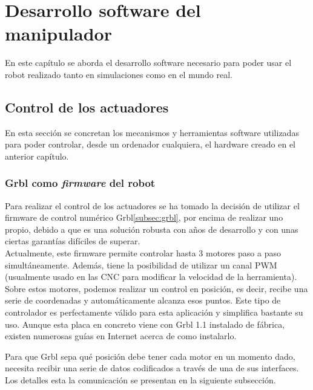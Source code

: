 \chapter{Desarrollo software del manipulador}
\label{cap:capitulo6}

\vspace{1cm}
\noindent En este capítulo se aborda el desarrollo software necesario para poder usar el robot realizado 
tanto en simulaciones como en el mundo real.

\section{Control de los actuadores}
\noindent En esta sección se concretan los mecanismos y herramientas software utilizadas para poder controlar, desde 
un ordenador cualquiera, el hardware creado en el anterior capítulo.

\subsection{Grbl como \textit{firmware} del robot}
\noindent Para realizar el control de los actuadores se ha tomado la decisión de utilizar el 
firmware de control numérico Grbl\ref{subsec:grbl}, por encima 
de realizar uno propio, debido a que es una solución robusta con años de desarrollo y con unas ciertas garantías difíciles de superar.
\\
Actualmente, este firmware permite controlar hasta 3 motores paso a paso simultáneamente. Además, tiene la posibilidad de utilizar 
un canal PWM (usualmente usado en las CNC para modificar la velocidad de la herramienta). Sobre estos motores, podemos realizar 
un control en posición, es decir, recibe una serie de coordenadas y automáticamente alcanza esos puntos. Este tipo de controlador 
es perfectamente válido para esta aplicación y simplifica bastante su uso. Aunque esta placa en concreto viene con Grbl 1.1 instalado 
de fábrica, existen numerosas guías en Internet acerca de como instalarlo.

Para que Grbl sepa qué posición debe tener cada motor en un momento dado, necesita recibir 
una serie de datos codificados a través de una de sus interfaces. Los detalles esta la comunicación 
se presentan en la siguiente subsección.
\newpage
